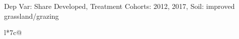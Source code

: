 \begin{table}[H]
\captionlistentry[table]{}
\label{table:beaver_land_class_DVis_land_class_3_SCg12_SSIGRG}
\scriptsize %
Dep Var: Share Developed, Treatment Cohorts: 2012, 2017, Soil: improved grassland/grazing \\
\begin{threeparttable}
\begin{tabulary}{\textwidth}{l*{7}{c}@{}}
\toprule \toprule
\noalign{\smallskip}
\noalign{\smallskip}
\midrule \bottomrule
\end{tabulary}
\medskip
\end{threeparttable}
\end{table}
